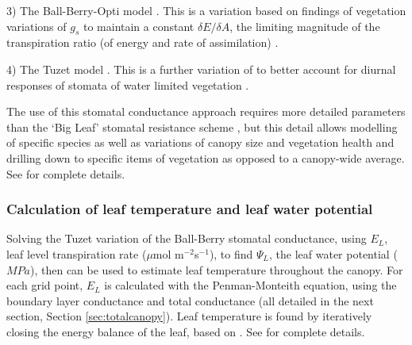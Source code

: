 \documentclass[preprint,12pt,authoryear]{elsarticle}
\begin{document}
3) The Ball-Berry-Opti model \citep{Medlyn2011}. This is a variation based on findings of vegetation variations of $g_{s}$ to maintain a constant $\delta{E}/\delta{A}$, the limiting magnitude of the transpiration ratio (of energy and rate of assimilation) \citep{Cowan1977}. 



4) The Tuzet model \citep{Tuzet2003}. This is a further variation of \cite{Leuning1995} to better account for diurnal responses of stomata of water limited vegetation \citep{Tuzet2003}.


The use of this stomatal conductance approach requires more detailed parameters than the `Big Leaf' stomatal resistance scheme \citep{Bailey1981,Kowalczyk1991}, but this detail allows modelling of specific species as well as variations of canopy size and vegetation health and drilling down to specific items of vegetation \citep{Duursma2012} as opposed to a canopy-wide average. See \cite{Duursma2012} for complete details.


\subsubsection{Calculation of leaf temperature and leaf water potential}\label{sec:calcleaftemp}
Solving the Tuzet variation of the Ball-Berry stomatal conductance, using $E_{L}$, leaf level transpiration rate ($\mu$mol m$^{-2}$s$^{-1}$), to find $\Psi_{L}$, the leaf water potential ($MPa$), then can be used to estimate leaf temperature throughout the canopy. For each grid point, $E_{L}$ is calculated with the Penman-Monteith equation, using the boundary layer conductance and total conductance (all detailed in the next section, Section \ref{sec:totalcanopy}). Leaf temperature is found by iteratively closing the energy balance of the leaf, based on \cite{Wang1998}. See \cite{Duursma2012} for complete details.
\end{document}
